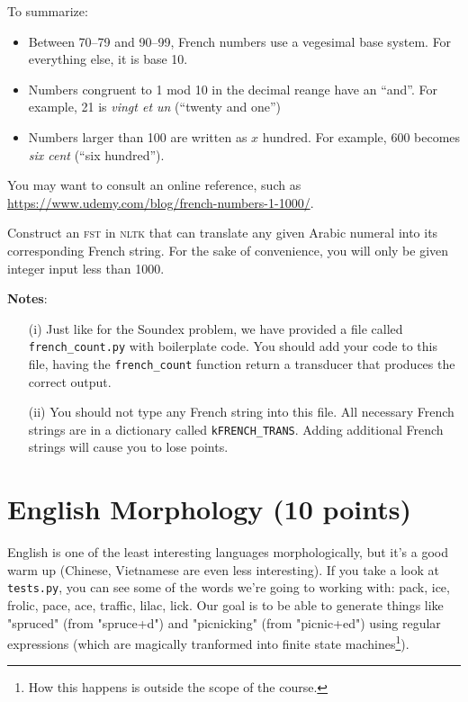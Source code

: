 \documentclass[11pt]{article}
\begin{document}
\noindent To summarize:
\begin{itemize}
\item Between 70--79 and 90--99, French numbers use a
vegesimal base system.  For everything else, it is base 10.
\item Numbers congruent to 1 mod 10 in the decimal reange have an ``and''.  For example, 21
  is \textit{vingt et un} (``twenty and one'')
\item Numbers larger than 100 are written as $x$ hundred.  For
  example, 600 becomes \textit{six cent} (``six hundred'').
\end{itemize}

You may want to consult an online reference, such as \url{https://www.udemy.com/blog/french-numbers-1-1000/}.

Construct an \textsc{fst} in \textsc{nltk} that can translate any
given Arabic numeral into its corresponding French string. For the
sake of convenience, you will only be given integer input less than
1000.


\noindent \textbf{Notes}:
\begin{itemize}
	\item[(i)]  Just like for the Soundex problem, we have provided a file
          called \texttt{french\_count.py} with boilerplate code. You
          should add your code to this file, having the
          \texttt{french\_count} function return a transducer that
          produces the correct output.
	\item[(ii)] You should not type any French string into this
          file.  All necessary French strings are in a dictionary
          called \texttt{kFRENCH\_TRANS}.  Adding additional French
          strings will cause you to lose points.
\end{itemize}

\section*{English Morphology (10 points)}

English is one of the least interesting languages morphologically, but
it's a good warm up (Chinese, Vietnamese are even less
interesting). If you take a look at \texttt{tests.py}, you can see
some of the words we're going to working with: pack, ice, frolic,
pace, ace, traffic, lilac, lick.  Our goal is to be able to generate
things like "spruced" (from "spruce+d") and "picnicking" (from
"picnic+ed") using regular expressions (which are magically tranformed
into finite state machines\footnote{How this happens is outside the
  scope of the course.}).
\end{document}

